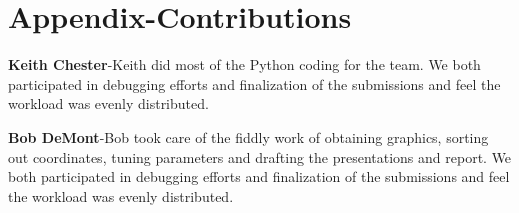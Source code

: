\documentclass{article}
\begin{document}
\begin{multicols}{2}
\begin{thebibliography}{10}
\end{thebibliography}
\pagebreak
\section*{Appendix-Contributions}
\noindent \textbf{Keith Chester}-Keith did most of the Python coding for the team.  We both participated in debugging efforts and finalization of the submissions and feel the workload was evenly distributed.
\bigskip

\noindent \textbf{Bob DeMont}-Bob took care of the fiddly work of obtaining graphics, sorting out coordinates, tuning parameters and drafting the presentations and report.  We both participated in debugging efforts and finalization of the submissions and feel the workload was evenly distributed.
 
 

\end{multicols}
\end{document}

